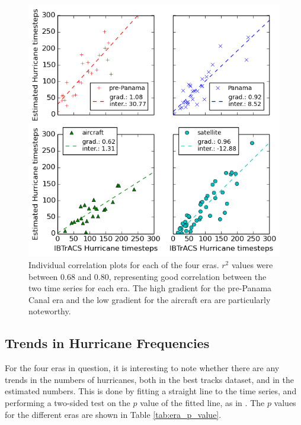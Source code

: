 \documentclass[pdftex,12pt,a4paper]{report}
\begin{document}
\begin{figure}[ht!]
    \centering
    \includegraphics[width=\textwidth]{figures/20th_century_corr_split}
    \caption{Individual correlation plots for each of the four eras. $r^2$ values were between 0.68
    and 0.80, representing good correlation between the two time series for each era. The high
    gradient for the pre-Panama Canal era and the low gradient for the aircraft era are particularly
    noteworthy. }
    \label{fig:20th_century_hurricane_corr_split}
\end{figure}

\newpage
\subsection{Trends in Hurricane Frequencies}
\label{sec:trends_freq}

For the four eras in question, it is interesting to note whether there are any trends in the numbers
of hurricanes, both in the best tracks dataset, and in the estimated numbers. This is done by
fitting a straight line to the time series, and performing a two-sided test on the $p$ value of the
fitted line, as in \textcite{vecchi2008estimates, emanuel2010tropical}. The $p$ values for the
different eras are shown in Table \ref{tab:era_p_value}.
\end{document}
